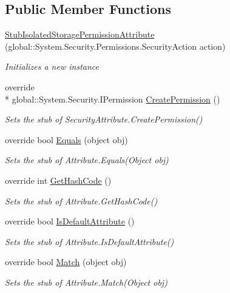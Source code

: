 \subsection*{Public Member Functions}
\begin{DoxyCompactItemize}
\item 
\hyperlink{class_system_1_1_security_1_1_permissions_1_1_fakes_1_1_stub_isolated_storage_permission_attribute_ab11e64600edf4148c3245a78e81ac201}{Stub\-Isolated\-Storage\-Permission\-Attribute} (global\-::\-System.\-Security.\-Permissions.\-Security\-Action action)
\begin{DoxyCompactList}\small\item\em Initializes a new instance\end{DoxyCompactList}\item 
override \\*
global\-::\-System.\-Security.\-I\-Permission \hyperlink{class_system_1_1_security_1_1_permissions_1_1_fakes_1_1_stub_isolated_storage_permission_attribute_a3e5a689d03695232e0aedb72eda583cf}{Create\-Permission} ()
\begin{DoxyCompactList}\small\item\em Sets the stub of Security\-Attribute.\-Create\-Permission()\end{DoxyCompactList}\item 
override bool \hyperlink{class_system_1_1_security_1_1_permissions_1_1_fakes_1_1_stub_isolated_storage_permission_attribute_a91367a917b64d53e9730c34716bed611}{Equals} (object obj)
\begin{DoxyCompactList}\small\item\em Sets the stub of Attribute.\-Equals(\-Object obj)\end{DoxyCompactList}\item 
override int \hyperlink{class_system_1_1_security_1_1_permissions_1_1_fakes_1_1_stub_isolated_storage_permission_attribute_aa3aa27c023b6e52c381a576142e5fdaf}{Get\-Hash\-Code} ()
\begin{DoxyCompactList}\small\item\em Sets the stub of Attribute.\-Get\-Hash\-Code()\end{DoxyCompactList}\item 
override bool \hyperlink{class_system_1_1_security_1_1_permissions_1_1_fakes_1_1_stub_isolated_storage_permission_attribute_abf4d327cb56bf92532cca7a86ed04c60}{Is\-Default\-Attribute} ()
\begin{DoxyCompactList}\small\item\em Sets the stub of Attribute.\-Is\-Default\-Attribute()\end{DoxyCompactList}\item 
override bool \hyperlink{class_system_1_1_security_1_1_permissions_1_1_fakes_1_1_stub_isolated_storage_permission_attribute_a7b7f06ff5470912753e071e78625b416}{Match} (object obj)
\begin{DoxyCompactList}\small\item\em Sets the stub of Attribute.\-Match(\-Object obj)\end{DoxyCompactList}\end{DoxyCompactItemize}
